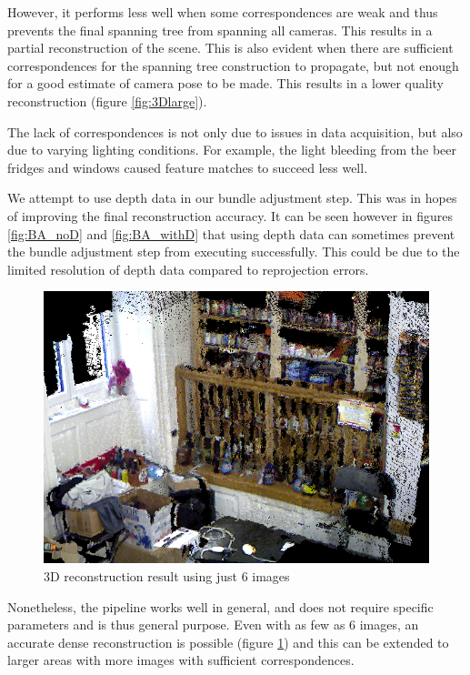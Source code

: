 \documentclass[10pt,twocolumn,letterpaper]{article}
\begin{document}
However, it performs less well when some correspondences are weak and thus
prevents the final spanning tree from spanning all cameras. This results in a
partial reconstruction of the scene. This is also evident when there are
sufficient correspondences for the spanning tree construction to propagate,
but not enough for a good estimate of camera pose to be made. This results in a
lower quality reconstruction (figure \ref{fig:3Dlarge}).

The lack of correspondences is not only due to issues in data acquisition, but
also due to varying lighting conditions. For example, the light bleeding from
the beer fridges and windows caused feature matches to succeed less well.

We attempt to use depth data in our bundle adjustment step. This was in hopes of
improving the final reconstruction accuracy. It can be seen however in figures
\ref{fig:BA_noD} and \ref{fig:BA_withD} that using depth data can sometimes
prevent the bundle adjustment step from executing successfully. This could be
due to the limited resolution of depth data compared to reprojection errors.

\begin{figure}
\begin{center}
   \includegraphics[width=0.9\linewidth]{figures/result_tiny_noBA.png}
\end{center}
\caption{3D reconstruction result using just 6 images}
\label{fig:3D_6images}
\end{figure}

Nonetheless, the pipeline works well in general, and does not require specific
parameters and is thus general purpose. Even with as few as 6 images, an
accurate dense reconstruction is possible (figure \ref{fig:3D_6images}) and this can be extended to larger
areas with more images with sufficient correspondences.
\end{document}
